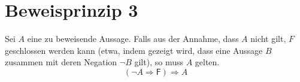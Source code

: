 \documentclass{article}
\begin{document}
\large
\section*{Beweisprinzip 3}
Sei $A$ eine zu beweisende Aussage. Falls aus der Annahme, dass $A$ nicht
gilt, $F$ geschlossen werden kann (etwa, indem gezeigt wird, dass eine
Aussage $B$ zusammen mit deren Negation $\neg B$ gilt), so muss $A$ gelten.
\[
    (\neg A \Rightarrow \mathsf{F}) \Rightarrow A
\]
\end{document}

